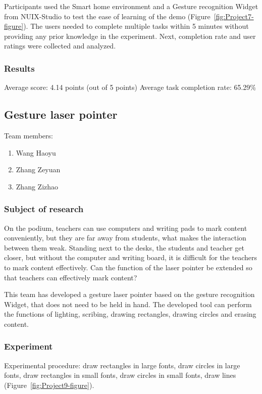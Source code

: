 Participants used the Smart home environment and a Gesture recognition Widget from NUIX-Studio to test the ease of learning of the demo (Figure~\ref{fig:Project7-figure}). The users needed to complete multiple tasks within 5 minutes without providing any prior knowledge in the experiment.
Next, completion rate and user ratings were collected and analyzed.

\subsubsection{Results}

Average score: 4.14 points (out of 5 points)
Average task completion rate: 65.29\%

\subsection{Gesture laser pointer}

Team members:
\begin{enumerate}
    \item Wang Haoyu
    \item Zhang Zeyuan 
    \item Zhang Zizhao
\end{enumerate}


\subsubsection{Subject of research}
On the podium, teachers can use computers and writing pads to mark content conveniently, but they are far away from students, what makes the interaction between them weak.
Standing next to the desks, the students and teacher get closer, but without the computer and writing board, it is difficult for the teachers to mark content effectively.
Can the function of the laser pointer be extended so that teachers can effectively mark content? 

This team has developed a gesture laser pointer based on the gesture recognition Widget, that does not need to be held in hand.
The developed tool can perform the functions of lighting, scribing, drawing rectangles, drawing circles and erasing content.

\subsubsection{Experiment}

Experimental procedure: draw rectangles in large fonts, draw circles in large fonts, draw rectangles in small fonts, draw circles in small fonts, draw lines (Figure~\ref{fig:Project9-figure}). 

